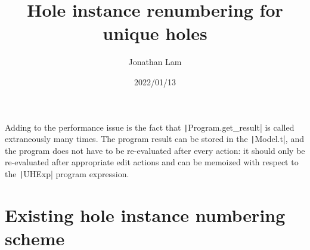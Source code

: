 \message{ !name(main.tex)}\documentclass{article}
\title{Hole instance renumbering for unique holes}
\author{Jonathan Lam}
\date{2022/01/13}
\begin{document}

Adding to the performance issue is the fact that \texttt|Program.get_result| is called extraneously many times. The program result can be stored in the \texttt|Model.t|, and the program does not have to be re-evaluated after every action: it should only be re-evaluated after appropriate edit actions and can be memoized with respect to the \texttt|UHExp| program expression.

\section{Existing hole instance numbering scheme}
\end{document}

